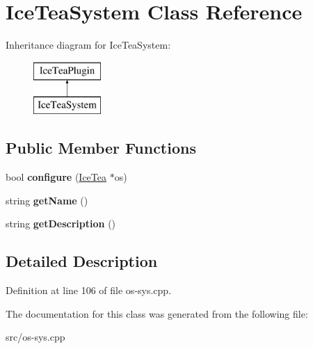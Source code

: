 \hypertarget{class_ice_tea_system}{}\section{Ice\+Tea\+System Class Reference}
\label{class_ice_tea_system}
Inheritance diagram for Ice\+Tea\+System\+:\begin{figure}[H]
\begin{center}
\leavevmode
\includegraphics[height=2.000000cm]{class_ice_tea_system}
\end{center}
\end{figure}
\subsection*{Public Member Functions}
\begin{DoxyCompactItemize}
\item 
bool {\bfseries configure} (\hyperlink{class_ice_tea}{Ice\+Tea} $\ast$os)\hypertarget{class_ice_tea_system_a64ffa67450093c3878a3d6469973b856}{}\label{class_ice_tea_system_a64ffa67450093c3878a3d6469973b856}

\item 
string {\bfseries get\+Name} ()\hypertarget{class_ice_tea_system_a9e7021d4a9a194f2f53217fadac38272}{}\label{class_ice_tea_system_a9e7021d4a9a194f2f53217fadac38272}

\item 
string {\bfseries get\+Description} ()\hypertarget{class_ice_tea_system_af37e80772a71554d8d54db52cb2596c9}{}\label{class_ice_tea_system_af37e80772a71554d8d54db52cb2596c9}

\end{DoxyCompactItemize}


\subsection{Detailed Description}


Definition at line 106 of file os-\/sys.\+cpp.



The documentation for this class was generated from the following file\+:\begin{DoxyCompactItemize}
\item 
src/os-\/sys.\+cpp\end{DoxyCompactItemize}
